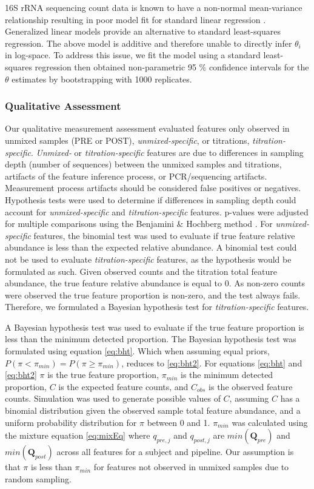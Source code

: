 \documentclass{bmcart}
\begin{document}
16S rRNA sequencing count data is known to have a non-normal
mean-variance relationship resulting in poor model fit for standard
linear regression \cite{McMurdie2014}. Generalized linear models
provide an alternative to standard least-squares regression. The above
model is additive and therefore unable to directly infer \(\theta_i\) in
log-space. To address this issue, we fit the model using a standard
least-squares regression then obtained non-parametric 95 \% confidence
intervals for the \(\theta\) estimates by bootstrapping with 1000
replicates.

\subsubsection*{Qualitative Assessment}

Our qualitative measurement assessment evaluated features only observed
in unmixed samples (PRE or POST), \emph{unmixed-specific}, or
titrations, \emph{titration-specific}. \emph{Unmixed-} or
\emph{titration-specific} features are due to differences in sampling
depth (number of sequences) between the unmixed samples and titrations,
artifacts of the feature inference process, or PCR/sequencing artifacts.
Measurement process artifacts should be considered false positives or
negatives. Hypothesis tests were used to determine if differences in
sampling depth could account for \emph{unmixed-specific} and
\emph{titration-specific} features. p-values were adjusted for multiple
comparisons using the Benjamini \& Hochberg method
\cite{benjamini1995controlling}. For \emph{unmixed-specific}
features, the binomial test was used to evaluate if true feature
relative abundance is less than the expected relative abundance. A
binomial test could not be used to evaluate \emph{titration-specific}
features, as the hypothesis would be formulated as such. Given observed
counts and the titration total feature abundance, the true feature
relative abundance is equal to 0. As non-zero counts were observed the
true feature proportion is non-zero, and the test always fails.
Therefore, we formulated a Bayesian hypothesis test for
\emph{titration-specific} features.

A Bayesian hypothesis test was used to evaluate if the true feature
proportion is less than the minimum detected proportion. The Bayesian
hypothesis test was formulated using equation \eqref{eq:bht}. Which when
assuming equal priors, \(P(\pi < \pi_{min}) = P(\pi \geq \pi_{min})\),
reduces to \eqref{eq:bht2}. For equations \eqref{eq:bht} and \eqref{eq:bht2}
\(\pi\) is the true feature proportion, \(\pi_{min}\) is the minimum
detected proportion, \(C\) is the expected feature counts, and
\(C_{obs}\) is the observed feature counts. Simulation was used to
generate possible values of \(C\), assuming \(C\) has a binomial
distribution given the observed sample total feature abundance, and a
uniform probability distribution for \(\pi\) between 0 and 1.
\(\pi_{min}\) was calculated using the mixture equation \eqref{eq:mixEq}
where \(q_{pre,j}\) and \(q_{post,j}\) are \(min(\textbf{Q}_{pre})\) and
\(min(\textbf{Q}_{post})\) across all features for a subject and
pipeline. Our assumption is that \(\pi\) is less than \(\pi_{min}\) for
features not observed in unmixed samples due to random sampling.
\end{document}

